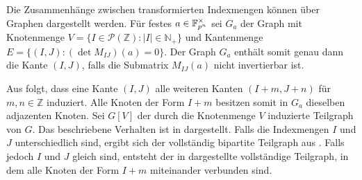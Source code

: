 \begin{sloppypar}
    Die Zusammenhänge zwischen transformierten Indexmengen können über Graphen dargestellt werden. Für festes ${a \in \field{p}[n]^\times}$ sei $G_a$ der Graph mit Knotenmenge ${V=\{I \in\mathcal{P}(\mathbb{Z}) : |I| \in \mathbb{N}_+\}}$ und Kantenmenge $E = \{(I,J) : (\det M_{IJ})(a) = 0\}$. Der Graph $G_a$ enthält somit genau dann die Kante $(I,J)$, falls die Submatrix $M_{IJ}(a)$ nicht invertierbar ist.
\end{sloppypar}

Aus  folgt, dass eine Kante $(I,J)$ alle weiteren Kanten $(I+m,J+n)$ für ${m,n\in \mathbb{Z}}$ induziert. Alle Knoten der Form $I+m$ besitzen somit in $G_a$ dieselben adjazenten Knoten. Sei $G[V]$ der durch die Knotenmenge $V$ induzierte Teilgraph von $G$. Das beschriebene Verhalten ist in  dargestellt. Falls die Indexmengen $I$ und $J$ unterschiedlich sind, ergibt sich der vollständig bipartite Teilgraph aus . Falls jedoch $I$ und $J$ gleich sind, entsteht der in  dargestellte vollständige Teilgraph, in dem alle Knoten der Form $I+m$ miteinander verbunden sind. 

